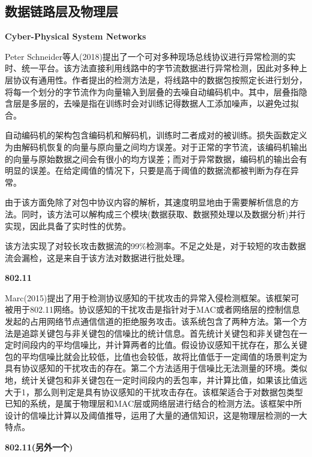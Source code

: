 \documentclass[12pt]{article} %
\begin{document}
\subsection{数据链路层及物理层}
\label{phy}

\textbf{Cyber-Physical System Networks}

Peter Schneider等人(2018)提出了一个可对多种现场总线协议进行异常检测的实时、统一平台。该方法直接利用线路中的字节流数据进行异常检测，因此对多种上层协议有通用性。作者提出的检测方法是，将线路中的数据包按照定长进行划分，将每一个划分的字节流作为向量输入到层叠的去噪自动编码机中。其中，层叠指隐含层是多层的，去噪是指在训练时会对训练记得数据人工添加噪声，以避免过拟合。

自动编码机的架构包含编码机和解码机，训练时二者成对的被训练。损失函数定义为由解码机恢复的向量与原向量之间均方误差。对于正常的字节流，该编码机输出的向量与原始数据之间会有很小的均方误差；而对于异常数据，编码机的输出会有明显的误差。在给定阈值的情况下，只要是高于阈值的数据流都被判断为存在异常。

由于该方面免除了对包中协议内容的解析，其速度明显地由于需要解析信息的方法。同时，该方法可以解构成三个模块(数据获取、数据预处理以及数据分析)并行实现，因此具备了实时性的优势。

该方法实现了对较长攻击数据流的99\%检测率。不足之处是，对于较短的攻击数据流会漏检，这是来自于该方法对数据进行批处理。

\textbf{802.11}

Marc(2015)提出了用于检测协议感知的干扰攻击的异常入侵检测框架。该框架可被用于802.11网络。协议感知的干扰攻击是指针对于MAC或者网络层的控制信息发起的占用网络节点通信信道的拒绝服务攻击。该系统包含了两种方法。第一个方法是追踪关键包与非关键包的信噪比的统计信息。首先统计关键包和非关键包在一定时间段内的平均信噪比，并计算两者的比值。假设协议感知干扰存在，那么关键包的平均信噪比就会比较低，比值也会较低，故将比值低于一定阈值的场景判定为具有协议感知的干扰攻击的存在。第二个方法适用于信噪比无法测量的环境。类似地，统计关键包和非关键包在一定时间段内的丢包率，并计算比值，如果该比值远大于1，那么则判定是具有协议感知的干扰攻击存在。该框架适合于对数据包类型已知的系统，是属于物理层和MAC层或网络层进行结合的检测方法。该框架中所设计的信噪比计算以及阈值推导，运用了大量的通信知识，这是物理层检测的一大特点。

\textbf{802.11(另外一个)}
\end{document}
